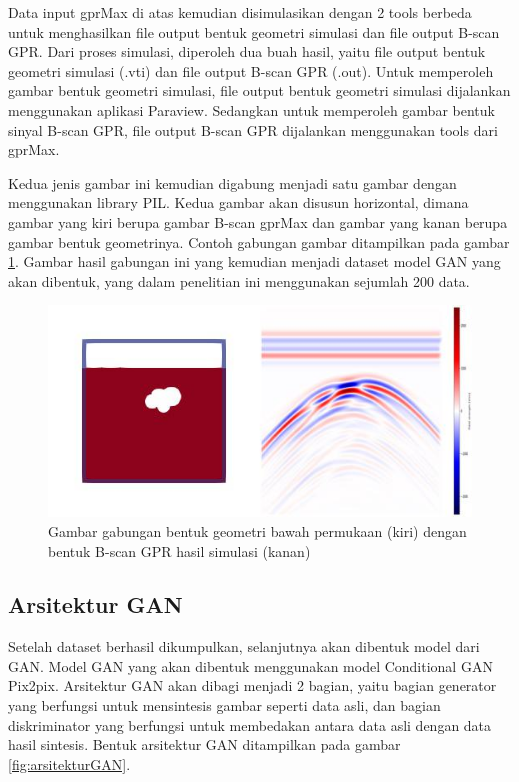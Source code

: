 Data input gprMax di atas kemudian disimulasikan dengan 2 tools berbeda untuk menghasilkan file output bentuk geometri simulasi dan file output B-scan GPR. 
Dari proses simulasi, diperoleh dua buah hasil, yaitu file output bentuk geometri simulasi (.vti) dan file output B-scan GPR (.out). 
Untuk memperoleh gambar bentuk geometri simulasi, file output bentuk geometri simulasi dijalankan menggunakan aplikasi Paraview. 
Sedangkan untuk memperoleh gambar bentuk sinyal B-scan GPR, file output B-scan GPR dijalankan menggunakan tools dari gprMax.

Kedua jenis gambar ini kemudian digabung menjadi satu gambar dengan menggunakan library PIL. 
Kedua gambar akan disusun horizontal, dimana gambar yang kiri berupa gambar B-scan gprMax dan gambar yang kanan berupa gambar bentuk geometrinya. 
Contoh gabungan gambar ditampilkan pada gambar \ref{fig:contohdata}. 
Gambar hasil gabungan ini yang kemudian menjadi dataset model GAN yang akan dibentuk, yang dalam penelitian ini menggunakan sejumlah 200 data.

\begin{figure}[ht]
  \centering
  \includegraphics[scale=0.7]{gambar/data1.jpg}
  \caption{Gambar gabungan bentuk geometri bawah permukaan (kiri) dengan bentuk B-scan GPR hasil simulasi (kanan)}
  \label{fig:contohdata}
\end{figure}

\subsection{Arsitektur GAN}
\label{subsec:arsitekturGAN}

Setelah dataset berhasil dikumpulkan, selanjutnya akan dibentuk model dari GAN. 
Model GAN yang akan dibentuk menggunakan model Conditional GAN Pix2pix. 
Arsitektur GAN akan dibagi menjadi 2 bagian, yaitu bagian generator yang berfungsi untuk mensintesis gambar seperti data asli, dan bagian diskriminator yang berfungsi untuk membedakan antara data asli dengan data hasil sintesis. 
Bentuk arsitektur GAN ditampilkan pada gambar \ref{fig:arsitekturGAN}.

